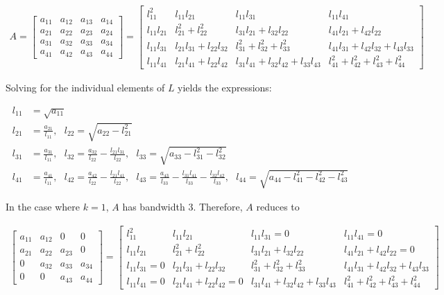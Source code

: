 \documentclass{article}
\begin{document}
		\begin{align*}
			A=
			\begin{bmatrix}
			a_{11} & a_{12} & a_{13} & a_{14} \\
			a_{21} & a_{22} & a_{23} & a_{24}  \\
			a_{31} & a_{32} & a_{33} & a_{34} \\
			a_{41}  & a_{42} & a_{43} & a_{44}
			\end{bmatrix}=
			\begin{bmatrix}
			l_{11}^{2} & l_{11}l_{21} & l_{11}l_{31} & l_{11}l_{41} \\
			l_{11}l_{21} & l_{21}^{2}+l_{22}^{2} & l_{31}l_{21}+l_{32}l_{22} & l_{41}l_{21}+l_{42}l_{22}\\
			l_{11}l_{31} & l_{21}l_{31}+l_{22}l_{32} & l_{31}^{2}+l_{32}^{2}+l_{33}^{2} & l_{41}l_{31}+l_{42}l_{32}+l_{43}l_{33} \\
			l_{11}l_{41} & l_{21}l_{41}+l_{22}l_{42} & l_{31}l_{41}+l_{32}l_{42}+l_{33}l_{43} & l_{41}^{2}+l_{42}^{2}+l_{43}^{2}+l_{44}^{2}
			\end{bmatrix}
		\end{align*}
		
		Solving for the individual elements of $L$ yields the expressions:
		
		\begin{align*}
		l_{11}&=\sqrt{a_{11}}\\
		l_{21}&=\frac{a_{21}}{l_{11}},\text{ }l_{22}=\sqrt{a_{22}-l_{21}^2}\\
		l_{31}&=\frac{a_{31}}{l_{11}},\text{ }l_{32}=\frac{a_{32}}{l_{22}}-\frac{l_{21}l_{31}}{l_{22}},\text{ }l_{33}=\sqrt{a_{33}-l_{31}^{2}-l_{32}^2}\\
		l_{41}&=\frac{a_{41}}{l_{11}},\text{ }l_{42}=\frac{a_{42}}{l_{22}}-\frac{l_{21}l_{41}}{l_{22}},\text{ }l_{43}=\frac{a_{43}}{l_{33}}-\frac{l_{31}l_{41}}{l_{33}}-\frac{l_{32}l_{42}}{l_{33}},\text{ }l_{44}=\sqrt{a_{44}-l_{41}^{2}-l_{42}^{2}-l_{43}^{2}}
		\end{align*}
		
		In the case where $k=1$, $A$ has bandwidth $3$.  Therefore, $A$ reduces to 
		
		\begin{align*}
			\begin{bmatrix}
			a_{11} & a_{12} & 0 & 0 \\
			a_{21} & a_{22} & a_{23} & 0  \\
			0 & a_{32} & a_{33} & a_{34} \\
			0  & 0 & a_{43} & a_{44}
			\end{bmatrix}=
			\begin{bmatrix}
			l_{11}^{2} & l_{11}l_{21} & l_{11}l_{31}=0 & l_{11}l_{41}=0 \\
			l_{11}l_{21} & l_{21}^{2}+l_{22}^{2} & l_{31}l_{21}+l_{32}l_{22} & l_{41}l_{21}+l_{42}l_{22}=0\\
			l_{11}l_{31}=0 & l_{21}l_{31}+l_{22}l_{32} & l_{31}^{2}+l_{32}^{2}+l_{33}^{2} & l_{41}l_{31}+l_{42}l_{32}+l_{43}l_{33} \\
			l_{11}l_{41}=0 & l_{21}l_{41}+l_{22}l_{42}=0 & l_{31}l_{41}+l_{32}l_{42}+l_{33}l_{43} & l_{41}^{2}+l_{42}^{2}+l_{43}^{2}+l_{44}^{2}
			\end{bmatrix}
		\end{align*}
		
\end{document}
